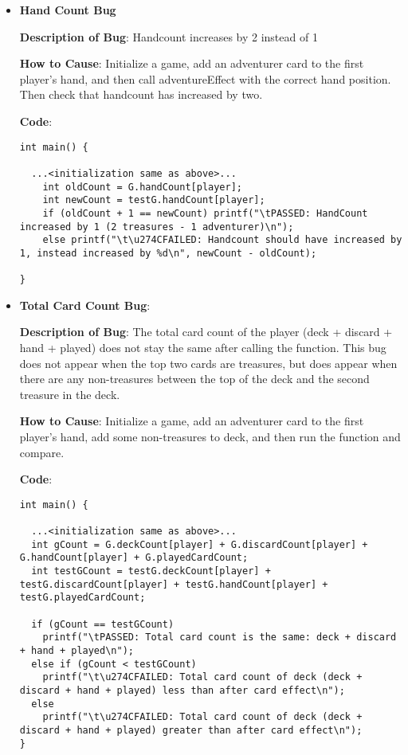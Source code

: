\documentclass[11pt,letterpaper]{article}
\begin{document}
\begin{enumerate}[label=\Roman*.]
\begin{enumerate}
\begin{itemize}[leftmargin=*]
        \item \textbf{Hand Count Bug}

        \textbf{Description of Bug}: Handcount increases by 2 instead of 1

        \textbf{How to Cause}: Initialize a game, add an adventurer card to 
          the first player's hand, and then call adventureEffect with the correct
          hand position. Then check that handcount has increased by two.

        \textbf{Code}:
          \begin{lstlisting}
int main() {

  ...<initialization same as above>...
    int oldCount = G.handCount[player];
    int newCount = testG.handCount[player];
    if (oldCount + 1 == newCount) printf("\tPASSED: HandCount increased by 1 (2 treasures - 1 adventurer)\n"); 
    else printf("\t\u274CFAILED: Handcount should have increased by 1, instead increased by %d\n", newCount - oldCount);

}
          \end{lstlisting}

        \item \textbf{Total Card Count Bug}:

          \textbf{Description of Bug}: The total card count of the player (deck + discard + hand + played)
            does not stay the same after calling the function. This bug does not appear when the top
            two cards are treasures, but does appear when there are any non-treasures between the top
            of the deck and the second treasure in the deck.

        \textbf{How to Cause}: Initialize a game, add an adventurer card to the first player's hand, 
            add some non-treasures to deck, and then run the function and compare. 

        \textbf{Code}:
          \begin{lstlisting}
int main() {

  ...<initialization same as above>...
  int gCount = G.deckCount[player] + G.discardCount[player] + G.handCount[player] + G.playedCardCount;
  int testGCount = testG.deckCount[player] + testG.discardCount[player] + testG.handCount[player] + testG.playedCardCount;
  
  if (gCount == testGCount)
    printf("\tPASSED: Total card count is the same: deck + discard + hand + played\n");
  else if (gCount < testGCount)
    printf("\t\u274CFAILED: Total card count of deck (deck + discard + hand + played) less than after card effect\n"); 
  else
    printf("\t\u274CFAILED: Total card count of deck (deck + discard + hand + played) greater than after card effect\n");
}
          \end{lstlisting}


\end{itemize}
\end{enumerate}
\end{enumerate}
\end{document}
